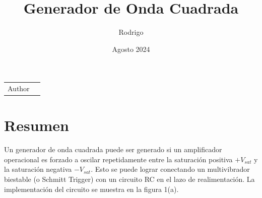 \documentclass{article}
\title{Generador de Onda Cuadrada}
\author{Rodrigo}
\date{Agosto 2024}
\begin{document}
	
	\maketitle
	
	\noindent\begin{tabular}{@{}ll}
		Author & \theauthor\\
	\end{tabular}
	
	\section*{Resumen}
Un generador de onda cuadrada puede ser generado si un amplificador operacional es forzado a oscilar repetidamente entre la saturación positiva $+V_{sat}$ y la saturación negativa $-V_{sat}$. Esto se puede lograr conectando un multivibrador biestable (o Schmitt Trigger) con un circuito RC en el lazo de realimentación. La implementación del circuito se muestra en la figura 1(a).
\end{document}

